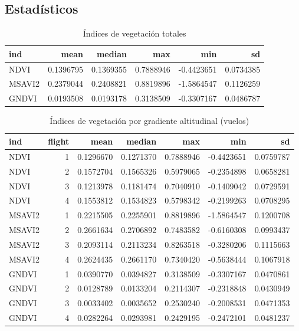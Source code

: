 \documentclass[spanish,openany]{article}
\begin{document}
\subsection{Estadísticos}\label{estadisticos}

\begin{table}[!h]

\caption{\label{tab:unnamed-chunk-2}Índices de vegetación totales}
\centering
\begin{tabular}[t]{lrrrrr}
\toprule
ind & mean & median & max & min & sd\\
\midrule
NDVI & 0.1396795 & 0.1369355 & 0.7888946 & -0.4423651 & 0.0734385\\
MSAVI2 & 0.2379044 & 0.2408821 & 0.8819896 & -1.5864547 & 0.1126259\\
GNDVI & 0.0193508 & 0.0193178 & 0.3138509 & -0.3307167 & 0.0486787\\
\bottomrule
\end{tabular}
\end{table}

\begin{table}[!h]

\caption{\label{tab:unnamed-chunk-3}Índices de vegetación por gradiente altitudinal (vuelos) }
\centering
\begin{tabular}[t]{lrrrrrr}
\toprule
ind & flight & mean & median & max & min & sd\\
\midrule
NDVI & 1 & 0.1296670 & 0.1271370 & 0.7888946 & -0.4423651 & 0.0759787\\
NDVI & 2 & 0.1572704 & 0.1565326 & 0.5979065 & -0.2354898 & 0.0658281\\
NDVI & 3 & 0.1213978 & 0.1181474 & 0.7040910 & -0.1409042 & 0.0729591\\
NDVI & 4 & 0.1553812 & 0.1534823 & 0.5798342 & -0.2199263 & 0.0708295\\
MSAVI2 & 1 & 0.2215505 & 0.2255901 & 0.8819896 & -1.5864547 & 0.1200708\\
\addlinespace
MSAVI2 & 2 & 0.2661634 & 0.2706892 & 0.7483582 & -0.6160308 & 0.0993437\\
MSAVI2 & 3 & 0.2093114 & 0.2113234 & 0.8263518 & -0.3280206 & 0.1115663\\
MSAVI2 & 4 & 0.2624435 & 0.2661170 & 0.7340420 & -0.5638444 & 0.1067918\\
GNDVI & 1 & 0.0390770 & 0.0394827 & 0.3138509 & -0.3307167 & 0.0470861\\
GNDVI & 2 & 0.0128789 & 0.0133204 & 0.2114307 & -0.2318848 & 0.0430949\\
\addlinespace
GNDVI & 3 & 0.0033402 & 0.0035652 & 0.2530240 & -0.2008531 & 0.0471353\\
GNDVI & 4 & 0.0282264 & 0.0293981 & 0.2429195 & -0.2472101 & 0.0481237\\
\bottomrule
\end{tabular}
\end{table}
\end{document}
